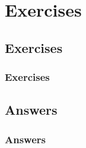 \section{Exercises}
\subsection{Exercises}

\begin{frame}
\frametitle{Exercises}

\end{frame}

\subsection{Answers}



\begin{frame}
\frametitle{Answers}

\end{frame}